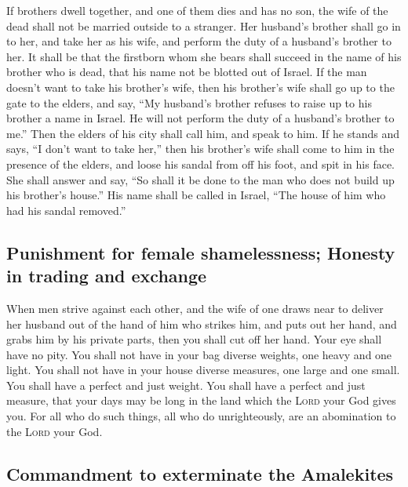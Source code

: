 If brothers dwell together, and one of them dies and has
no son, the wife of the dead shall not be married outside to a stranger.
Her husband's brother shall go in to her, and take her as his wife, and
perform the duty of a husband's brother to her.  It shall
be that the firstborn whom she bears shall succeed in the name of his
brother who is dead, that his name not be blotted out of Israel.
 If the man doesn't want to take his brother's wife, then
his brother's wife shall go up to the gate to the elders, and say, ``My
husband's brother refuses to raise up to his brother a name in Israel.
He will not perform the duty of a husband's brother to me.''
 Then the elders of his city shall call him, and speak to
him. If he stands and says, ``I don't want to take her,'' 
then his brother's wife shall come to him in the presence of the elders,
and loose his sandal from off his foot, and spit in his face. She shall
answer and say, ``So shall it be done to the man who does not build up
his brother's house.''  His name shall be called in
Israel, ``The house of him who had his sandal removed.''

\hypertarget{punishment-for-female-shamelessness-honesty-in-trading-and-exchange}{%
\subsection{Punishment for female shamelessness; Honesty in trading and
exchange}\label{punishment-for-female-shamelessness-honesty-in-trading-and-exchange}}

 When men strive against each other, and the wife of one
draws near to deliver her husband out of the hand of him who strikes
him, and puts out her hand, and grabs him by his private parts,
 then you shall cut off her hand. Your eye shall have no
pity.  You shall not have in your bag diverse weights,
one heavy and one light.  You shall not have in your
house diverse measures, one large and one small.  You
shall have a perfect and just weight. You shall have a perfect and just
measure, that your days may be long in the land which the \textsc{Lord}
your God gives you.  For all who do such things, all who
do unrighteously, are an abomination to the \textsc{Lord} your God.

\hypertarget{commandment-to-exterminate-the-amalekites}{%
\subsection{Commandment to exterminate the
Amalekites}\label{commandment-to-exterminate-the-amalekites}}

